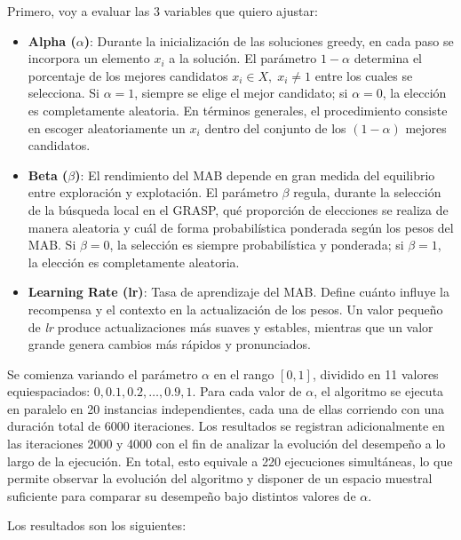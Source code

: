 \documentclass[12pt,a4paper]{book}
\begin{document}
Primero, voy a evaluar las 3 variables que quiero ajustar:
\begin{itemize}
    \item \textbf{Alpha ($\alpha$)}: Durante la inicialización de las soluciones greedy, en cada paso se incorpora un elemento $x_i$ a la solución. El parámetro $1-\alpha$ determina el porcentaje de los mejores candidatos $x_i \in X, \; x_i \neq 1$ entre los cuales se selecciona.  
Si $\alpha = 1$, siempre se elige el mejor candidato; si $\alpha = 0$, la elección es completamente aleatoria. En términos generales, el procedimiento consiste en escoger aleatoriamente un $x_i$ dentro del conjunto de los $(1-\alpha)$ mejores candidatos.
    \item \textbf{Beta ($\beta$)}: El rendimiento del MAB depende en gran medida del equilibrio entre exploración y explotación. El parámetro $\beta$ regula, durante la selección de la búsqueda local en el GRASP, qué proporción de elecciones se realiza de manera aleatoria y cuál de forma probabilística ponderada según los pesos del MAB.  
Si $\beta = 0$, la selección es siempre probabilística y ponderada; si $\beta = 1$, la elección es completamente aleatoria.
    \item \textbf{Learning Rate (lr)}: Tasa de aprendizaje del MAB. Define cuánto influye la recompensa y el contexto en la actualización de los pesos. 
Un valor pequeño de \textit{lr} produce actualizaciones más suaves y estables, mientras que un valor grande genera cambios más rápidos y pronunciados.
\end{itemize}

Se comienza variando el parámetro $\alpha$ en el rango $[0,1]$, dividido en 11 valores equiespaciados: $0, 0.1, 0.2, \dots, 0.9, 1$.  
Para cada valor de $\alpha$, el algoritmo se ejecuta en paralelo en 20 instancias independientes, cada una de ellas corriendo con una duración total de 6000 iteraciones. Los resultados se registran adicionalmente en las iteraciones 2000 y 4000 con el fin de analizar la evolución del desempeño a lo largo de la ejecución.
En total, esto equivale a 220 ejecuciones simultáneas, lo que permite observar la evolución del algoritmo y disponer de un espacio muestral suficiente para comparar su desempeño bajo distintos valores de $\alpha$.

Los resultados son los siguientes:
\end{document}
